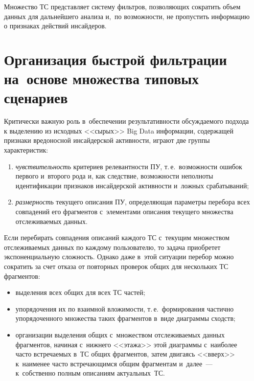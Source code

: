\begin{multicols}{2}
  Множество {ТС} представляет систему фильтров, позволяющих сократить 
объем данных для дальнейшего анализа и,~по возможности, не пропустить 
информацию о признаках действий инсайдеров. 
  
  \section{Организация быстрой фильтрации на~основе 
множества типовых сценариев} 
  
  Критически важную роль в~обеспечении результативности обсуждаемого 
подхода к выделению из исходных <<сырых>> Big Data информации, 
содержащей признаки вредоносной инсайдерской активности, играют две 
группы характеристик:
  \begin{enumerate}[(1)]
\item \textit{чувствительность} критериев релевантности ПУ, т.\,е.\ 
возможности ошибок первого и~второго рода и, как следствие, возможности 
неполноты идентификации признаков инсайдерской активности и~ложных 
срабатываний;
\item \textit{размерность} текущего описания ПУ, определяющая параметры 
перебора всех совпадений его фрагментов с~элементами описания текущего 
множества отслеживаемых данных.
\end{enumerate}

  Если перебирать совпадения описаний каждого ТС с~текущим множеством 
отслеживаемых данных по каждому пользователю, то задача приобретет 
экспоненциальную сложность. Однако даже в~этой ситуации перебор можно 
сократить за счет отказа от повторных проверок общих для нескольких ТС 
фрагментов:
  \begin{itemize}
\item выделения всех общих для всех ТС частей; 
\item упорядочения их по взаимной вложимости, т.\,е.\ формирования 
частично упорядоченного множества таких фрагментов в~виде диаграммы 
сходств;
\item организации выделения общих с~множеством отслеживаемых данных 
фрагментов, начиная с~нижнего <<этажа>> этой диаграммы с~наиболее 
часто встречаемых в~ТС общих фрагментов, затем двигаясь <<вверх>> 
к~наименее часто встречающимся общим фрагментам и~далее~--- 
к~собственно полным описаниям ак\-ту\-аль\-ных~ТС.
\end{itemize}


\end{multicols}
